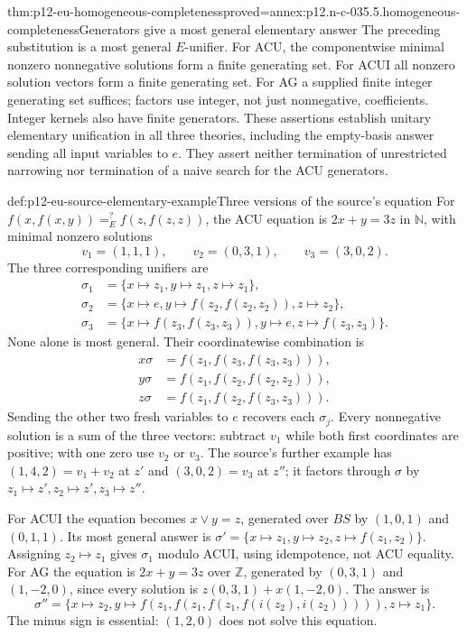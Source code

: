 \begin{hbtheorem}{thm:p12-eu-homogeneous-completeness}{proved=annex:p12.n-c-035.5.homogeneous-completeness}{Generators give a most general elementary answer}
The preceding substitution is a most general \(E\)-unifier. For ACU,
the componentwise minimal nonzero nonnegative solutions form a finite
generating set. For ACUI all nonzero solution vectors form a finite
generating set. For AG a supplied finite integer generating set suffices;
factors use integer, not just nonnegative, coefficients. Integer kernels
also have finite generators. These assertions establish unitary elementary
unification in all three theories, including
the empty-basis answer sending all input variables to \(e\).
They assert neither termination of unrestricted narrowing nor termination
of a naive search for the ACU generators.
\end{hbtheorem}

\begin{hbexample}{def:p12-eu-source-elementary-example}{Three versions of the source's equation}
For \(f(x,f(x,y))=^{?}_E f(z,f(z,z))\), the ACU equation is
\(2x+y=3z\) in \(\mathbb N\), with minimal nonzero solutions
\[
 v_1=(1,1,1),\qquad v_2=(0,3,1),\qquad v_3=(3,0,2).
\]
The three corresponding unifiers are
\[
\begin{aligned}
 \sigma_1&=\{x\mapsto z_1,y\mapsto z_1,z\mapsto z_1\},\\
 \sigma_2&=\{x\mapsto e,y\mapsto f(z_2,f(z_2,z_2)),z\mapsto z_2\},\\
 \sigma_3&=\{x\mapsto f(z_3,f(z_3,z_3)),y\mapsto e,z\mapsto f(z_3,z_3)\}.
\end{aligned}
\]
None alone is most general. Their coordinatewise combination is
\[
\begin{aligned}
 x\sigma&=f(z_1,f(z_3,f(z_3,z_3))),\\
 y\sigma&=f(z_1,f(z_2,f(z_2,z_2))),\\
 z\sigma&=f(z_1,f(z_2,f(z_3,z_3))).
\end{aligned}
\]
Sending the other two fresh variables to \(e\) recovers each
\(\sigma_j\). Every nonnegative solution is a sum of the three vectors:
subtract \(v_1\) while both first coordinates are positive; with one
zero use \(v_2\) or \(v_3\). The source's further example has
\((1,4,2)=v_1+v_2\) at \(z'\) and \((3,0,2)=v_3\) at
\(z''\); it factors through \(\sigma\) by
\(z_1\mapsto z',z_2\mapsto z',z_3\mapsto z''\).

For ACUI the equation becomes \(x\lor y=z\), generated over
\(BS\) by \((1,0,1)\) and \((0,1,1)\). Its most general answer is
\(\sigma'=\{x\mapsto z_1,y\mapsto z_2,z\mapsto f(z_1,z_2)\}\).
Assigning \(z_2\mapsto z_1\) gives \(\sigma_1\) modulo ACUI,
using idempotence, not ACU equality.
For AG the equation is \(2x+y=3z\) over \(\mathbb Z\), generated
by \((0,3,1)\) and \((1,-2,0)\), since every solution is
\(z(0,3,1)+x(1,-2,0)\). The answer is
\[
 \sigma''=\{x\mapsto z_2,
 y\mapsto f(z_1,f(z_1,f(z_1,f(i(z_2),i(z_2))))),z\mapsto z_1\}.
\]
The minus sign is essential: \((1,2,0)\) does not solve this equation.
\cite[\S5.1, pp.~504--506]{BaaderSnyder2001}
\end{hbexample}

